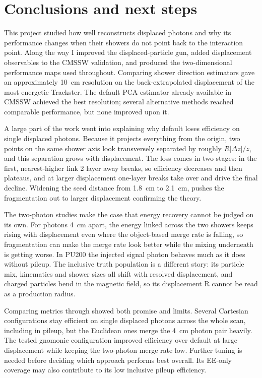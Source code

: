 \section{Conclusions and next steps}
\label{sec:conclusions}

This project studied how well \cluethreed{} reconstructs displaced photons
and why its performance changes when their showers do not point back to the
interaction point. Along the way I improved the displaced-particle gun, added displacement observables
to the CMSSW validation, and produced the two-dimensional performance maps used throughout. Comparing
shower direction estimators gave an approximately \SI{10}{cm} resolution on the
back-extrapolated displacement of the most energetic Trackster.
The default PCA estimator already available in CMSSW achieved the best resolution; several alternative methods reached comparable performance, but none improved upon it.

A large part of the work went into explaining why default \cluethreed{} loses efficiency on
single displaced photons. Because it projects everything from the origin, two points
on the same shower axis look transversely separated by roughly $R|\Delta z|/z$,
and this separation grows with displacement. The loss comes in two
stages: in the first, nearest-higher link 2 layer away breaks, so efficiency decreases and then plateaus, and at larger displacement one-layer breaks take over
and drive the final decline. Widening the seed distance from
\SI{1.8}{cm} to \SI{2.1}{cm}, pushes the
fragmentation out to larger displacement confirming the theory.

The two-photon studies make the case that energy recovery cannot be judged on
its own. For photons \SI{4}{cm} apart, the energy linked across the two showers
keeps rising with displacement even where the object-based merge rate is
falling, so fragmentation can make the merge rate look better while the mixing
underneath is getting worse. In PU200 the injected signal photon behaves much
as it does without pileup. The inclusive truth population is a different story:
its particle mix, kinematics and shower sizes all shift with resolved
displacement, and charged particles bend in the magnetic field, so its
displacement R cannot be read as a production radius.

Comparing metrics through \cluestering{} showed both promise and limits.
Several Cartesian configurations stay efficient on single displaced photons
across the whole scan, including in pileup, but the Euclidean ones merge the
\SI{4}{cm} photon pair heavily. The tested gnomonic configuration improved
efficiency over default \cluethreed{} at large displacement while keeping the
two-photon merge rate low. Further tuning is needed before deciding which
approach performs best overall. Its EE-only coverage may also contribute
to its low inclusive pileup efficiency.

